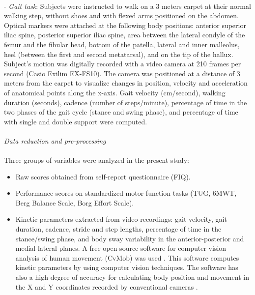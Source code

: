 \documentclass[12pt]{article}
\begin{document}
\\
- \emph{Gait task}: Subjects were instructed to walk on a 3 meters carpet at their normal walking step, without shoes and with flexed arms positioned on the abdomen. Optical markers were attached at the following body positions: anterior superior iliac spine, posterior superior iliac spine, area between the lateral condyle of the femur and the fibular head, bottom of the patella, lateral and inner malleolus, heel (between the first and second metatarsal), and on the tip of the hallux. Subject's motion was digitally recorded with a video camera at 210 frames per second (Casio Exilim EX-FS10). The camera was positioned at a distance of 3 meters from the carpet to visualize changes in position, velocity and acceleration of anatomical points along the x-axis. Gait velocity (cm/second), walking duration (seconds), cadence (number of steps/minute), percentage of time in the two phases of the gait cycle (stance and swing phase), and percentage of time with single and double support were computed.\\
\\
\emph{Data reduction and pre-processing}\\
\\
Three groups of variables were analyzed in the present study: 

\begin{itemize}

\item Raw scores obtained from self-report questionnaire (FIQ). 

\item Performance scores on standardized motor function tasks (TUG, 6MWT, Berg Balance Scale, Borg Effort Scale). 

\item Kinetic parameters extracted from video recordings: gait velocity, gait duration, cadence, stride and step lengths, percentage of time in the stance/swing phase, and body sway variability in the anterior-posterior and medial-lateral planes. A free open-source software for computer vision analysis of human movement (CvMob) was used \cite{pena2013free, gea2014viewing}. This software computes kinetic parameters by using computer vision techniques. The software has also a high degree of accuracy for calculating body position and movement in the X and Y coordinates recorded by conventional cameras \cite{pena2013free}.

\end{itemize}
\end{document}
